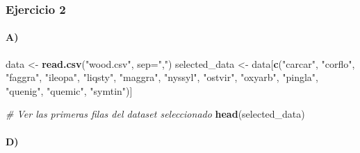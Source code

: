 \documentclass[
]{article}
\newenvironment{Shaded}{\begin{snugshade}}{\end{snugshade}}
\newcommand{\AttributeTok}[1]{\textcolor[rgb]{0.13,0.29,0.53}{#1}}
\newcommand{\CommentTok}[1]{\textcolor[rgb]{0.56,0.35,0.01}{\textit{#1}}}
\newcommand{\FunctionTok}[1]{\textcolor[rgb]{0.13,0.29,0.53}{\textbf{#1}}}
\newcommand{\NormalTok}[1]{#1}
\newcommand{\OtherTok}[1]{\textcolor[rgb]{0.56,0.35,0.01}{#1}}
\newcommand{\StringTok}[1]{\textcolor[rgb]{0.31,0.60,0.02}{#1}}
\begin{document}
\hypertarget{ejercicio-2-1}{%
\subsubsection{Ejercicio 2}\label{ejercicio-2-1}}

\hypertarget{a-3}{%
\paragraph{A)}\label{a-3}}

\begin{Shaded}
\begin{Highlighting}[]
\NormalTok{data }\OtherTok{\textless{}{-}} \FunctionTok{read.csv}\NormalTok{(}\StringTok{"wood.csv"}\NormalTok{, }\AttributeTok{sep=}\StringTok{","}\NormalTok{)}
\NormalTok{selected\_data }\OtherTok{\textless{}{-}}\NormalTok{ data[}\FunctionTok{c}\NormalTok{(}\StringTok{"carcar"}\NormalTok{, }\StringTok{"corflo"}\NormalTok{, }\StringTok{"faggra"}\NormalTok{, }\StringTok{"ileopa"}\NormalTok{, }\StringTok{"liqsty"}\NormalTok{, }
                        \StringTok{"maggra"}\NormalTok{, }\StringTok{"nyssyl"}\NormalTok{, }\StringTok{"ostvir"}\NormalTok{, }\StringTok{"oxyarb"}\NormalTok{, }\StringTok{"pingla"}\NormalTok{, }
                        \StringTok{"quenig"}\NormalTok{, }\StringTok{"quemic"}\NormalTok{, }\StringTok{"symtin"}\NormalTok{)]}

\CommentTok{\# Ver las primeras filas del dataset seleccionado}
\FunctionTok{head}\NormalTok{(selected\_data)}
\end{Highlighting}
\end{Shaded}

\hypertarget{d-3}{%
\paragraph{D)}\label{d-3}}
\end{document}
